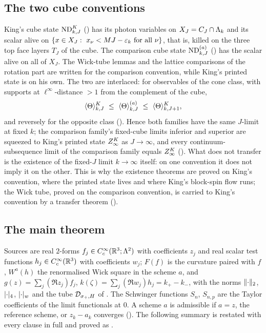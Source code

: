 \subsection{The two cube conventions}

King's cube state $\mathrm{ND}^{K}_{k,J}$ () has its photon variables on $X_J=C_J\cap\Lambda_k$ and its
scalar alive on $\{x\in X_J:\ x_\nu<MJ-\varepsilon_k\ \text{for all }\nu\}$, that is, killed on the three top
face layers $T_J$ of the cube. The comparison cube state $\mathrm{ND}^{(a)}_{k,J}$ () has the
scalar alive on all of $X_J$. The Wick-tube lemmas and the lattice comparisons of the rotation part are
written for the comparison convention, while King's printed state is on his own. The two are interlaced:
for observables of the cone class, with supports at $\ell^\infty$-distance $>1$ from the complement of the
cube,
\[
\avK{\Theta}\ \le\ \ava{\Theta}\ \le\ \langle\Theta\rangle^{K}_{k,J+1},
\]
and reversely for the opposite class (). Hence both families have the same $J$-limit at
fixed $k$; the comparison family's fixed-cube limits inferior and superior are squeezed to King's printed
state $Z^{K}_{\infty}$ as $J\to\infty$, and every continuum-subsequence limit of the comparison family equals
$Z^{K}_{\infty}$ (). What does not transfer is the existence of the fixed-$J$ limit $k\to\infty$
itself: on one convention it does not imply it on the other. This is why the existence theorems are proved
on King's convention, where the printed state lives and where King's block-spin flow runs; the Wick tube,
proved on the comparison convention, is carried to King's convention by a transfer theorem
().

\subsection{The main theorem}

Sources are real $2$-forms $f_j\in C^\infty_c(\mathbb R^3;\Lambda^2)$ with coefficients $z_j$ and real scalar test
functions $h_j\in C^\infty_c(\mathbb R^3)$ with coefficients $w_j$; $F(f)$ is the curvature paired with $f$,
$W^a(h)$ the renormalised Wick square in the scheme $a$, and $g(z)=\sum_j(\Re z_j)f_j$,
$k(\zeta)=\sum_j(\Re w_j)h_j=k_+-k_-$, with the norms $\lVert \cdot\rVert_2$, $\lvert \cdot\rvert_{4}$,
$\lvert \cdot\rvert_{w}$ and the tube $\mathcal D_{\sigma_+,H}$ of . The Schwinger functions
$S_n$, $S_{n,p}$ are the Taylor coefficients of the limit functionals at $0$. A scheme $a$ is admissible
if $a=z$, the reference scheme, or $z_k-a_k$ converges (). The following summary is
restated with every clause in full and proved as .

